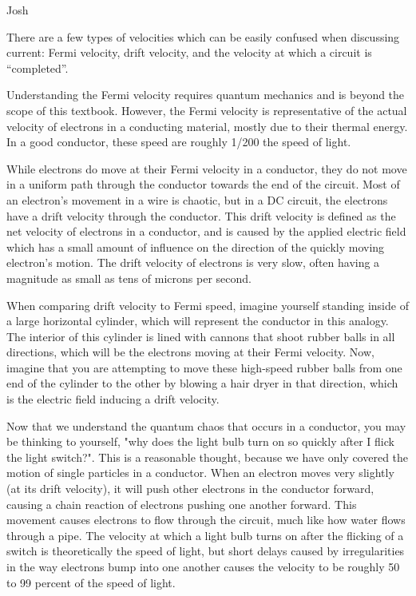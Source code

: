 \begin{studentOpinion}{Josh}{
There are a few types of velocities which can be easily confused when discussing current: Fermi velocity, drift velocity, and the velocity at which a circuit is ``completed''.
	
Understanding the Fermi velocity requires quantum mechanics and is beyond the scope of this textbook. However, the Fermi velocity is representative of the actual velocity of electrons in a conducting material, mostly due to their thermal energy. In a good conductor, these speed are roughly 1/200 the speed of light.
	
While electrons do move at their Fermi velocity in a conductor, they do not move in a uniform path through the conductor towards the end of the circuit. Most of an electron's movement in a wire is chaotic, but in a DC circuit, the electrons have a drift velocity through the conductor. This drift velocity is defined as the net velocity of electrons in a conductor, and is caused by the applied electric field which has a small amount of influence on the direction of the quickly moving electron's motion. The drift velocity of electrons is very slow, often having a magnitude as small as tens of microns per second. 
	
When comparing drift velocity to Fermi speed, imagine yourself standing inside of a large horizontal cylinder, which will represent the conductor in this analogy. The interior of this cylinder is lined with cannons that shoot rubber balls in all directions, which will be the electrons moving at their Fermi velocity. Now, imagine that you are attempting to move these high-speed rubber balls from one end of the cylinder to the other by blowing a hair dryer in that direction, which is the electric field inducing a drift velocity.
	
Now that we understand the quantum chaos that occurs in a conductor, you may be thinking to yourself, "why does the light bulb turn on so quickly after I flick the light switch?". This is a reasonable thought, because we have only covered the motion of single particles in a conductor. When an electron moves very slightly (at its drift velocity), it will push other electrons in the conductor forward, causing a chain reaction of electrons pushing one another forward. This movement causes electrons to flow through the circuit, much like how water flows through a pipe. The velocity at which a light bulb turns on after the flicking of a switch is theoretically the speed of light, but short delays caused by irregularities in the way electrons bump into one another causes the velocity to be roughly 50 to 99 percent of the speed of light.
}
\end{studentOpinion}

